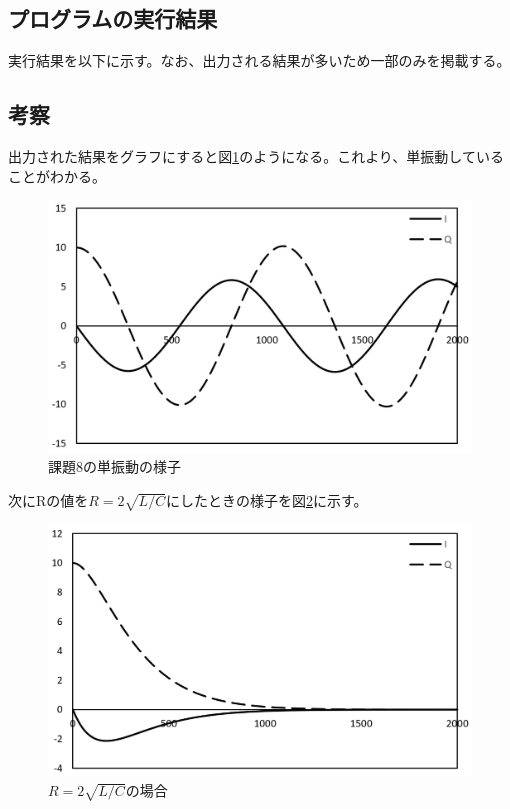 \documentclass[11pt,titlepage]{jsarticle}
\begin{document}
\subsection{プログラムの実行結果}
実行結果を以下に示す。なお、出力される結果が多いため一部のみを掲載する。
\begin{oframed}
\end{oframed}

\subsection{考察}
出力された結果をグラフにすると図\ref{fig:kadai8}のようになる。これより、単振動していることがわかる。
\begin{figure}[H]
\centering
\includegraphics[width=12cm]{img/kadai8.png}
\caption{課題8の単振動の様子}
\label{fig:kadai8}
\end{figure}

次にRの値を$R=2\sqrt{L/C}$にしたときの様子を図\ref{fig:kadai8_R}に示す。
\begin{figure}[H]
\centering
\includegraphics[width=12cm]{img/kadai8_R.png}
\caption{$R=2\sqrt{L/C}$の場合}
\label{fig:kadai8_R}
\end{figure}
\end{document}
